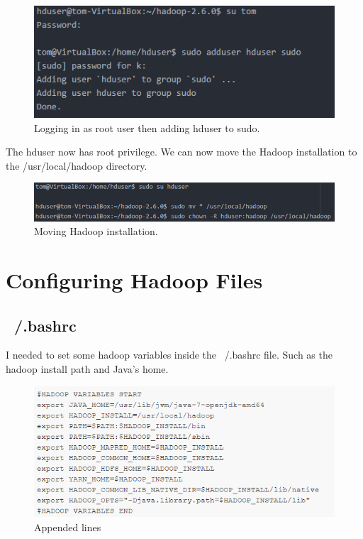 \documentclass[12pt, letterpaper]{article}
\begin{document}
\begin{figure}[H]
\centering
\includegraphics[width=12cm]{RH6}
\caption{Logging in as root user then adding hduser to sudo.}
\label{fig:ij}
\end{figure}

The hduser now has root privilege. We can now move the Hadoop installation to the /usr/local/hadoop directory.

\begin{figure}[H]
\centering
\includegraphics[width=12cm]{RH7}
\caption{Moving Hadoop installation.}
\label{fig:ij}
\end{figure}


\section{Configuring Hadoop Files}


\subsection{~/.bashrc}

I needed to set some hadoop variables inside the ~/.bashrc file. Such as the hadoop install path and Java's home.

\begin{figure}[H]
\centering
\includegraphics[width=12cm]{RH8}
\caption{Appended lines}
\label{fig:ij}
\end{figure}
\end{document}
